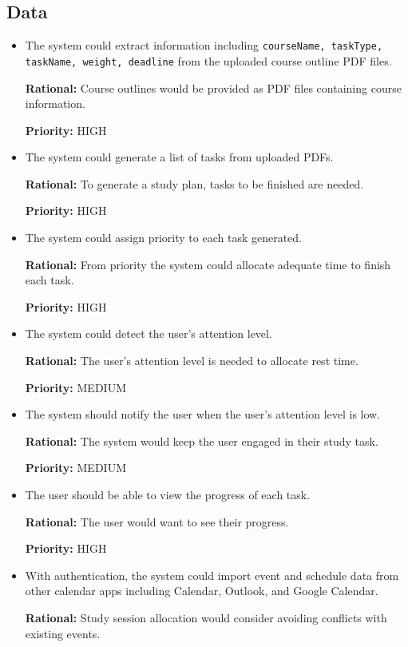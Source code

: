 \documentclass[12pt]{article}
\newcounter{reqnum} %
\newcommand{\rthereqnum}{FR\refstepcounter{reqnum}\thereqnum:}
\begin{document}
\subsection{Data}
\begin{itemize}
\item[\rthereqnum]
The system could extract information including \texttt{courseName, taskType, taskName, weight, deadline} from the uploaded course outline PDF files.

\textbf{Rational:} Course outlines would be provided as PDF files containing course information.

\textbf{Priority:} HIGH
\item[\rthereqnum]
The system could generate a list of tasks from uploaded PDFs.

\textbf{Rational:} To generate a study plan, tasks to be finished are needed.

\textbf{Priority:} HIGH
\item[\rthereqnum \label{R_prioritize_task}]
The system could assign priority to each task generated.

\textbf{Rational:} From priority the system could allocate adequate time to finish each task.

\textbf{Priority:} HIGH
\item[\rthereqnum]
The system could detect the user's attention level.

\textbf{Rational:} The user's attention level is needed to allocate rest time.

\textbf{Priority:} MEDIUM
\item[\rthereqnum]
The system should notify the user when the user's attention level is low.

\textbf{Rational:} The system would keep the user engaged in their study task.

\textbf{Priority:} MEDIUM
\item[\rthereqnum \label{R_check_task_progress}]
The user should be able to view the progress of each task.

\textbf{Rational:} The user would want to see their progress.

\textbf{Priority:} HIGH
\item[\rthereqnum]
With authentication, the system could import event and schedule data from other calendar apps including Calendar, Outlook, and Google Calendar.

\textbf{Rational:} Study session allocation would consider avoiding conflicts with existing events.


\end{itemize}
\end{document}

